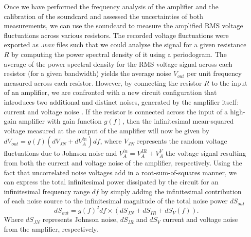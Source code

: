 \begin{linenumbers}
Once we have performed the frequency analysis of the amplifier and the calibration of the soundcard and assessed the uncertainties of both measurements, we can use the soundcard to measure the amplified RMS voltage fluctuations across various resistors. The recorded voltage fluctuations were exported as $.wav$ files such that we could analyse the signal for a given resistance $R$ by computing the power spectral density of it using a periodogram. The average of the power spectral density for the RMS voltage signal across each resistor (for a given bandwidth) yields the average noise $V_{out}$ per unit frequency measured across each resistor. 
However, by connecting the resistor $R$ to the input of an amplifier, we are confronted with a new circuit configuration that introduces two additional and distinct noises, generated by the amplifier itself: current and voltage noise \cite{article}. If the resistor is connected across the input of a high-gain amplifier with gain function $g(f)$, then the infinitesimal mean-squared voltage measured at the output of the amplifier will now be given by $dV_{out}=g(f)(dV_{JN}+dV_{A}^{in})df$, where $V_{JN}$ represents the random voltage fluctuations due to Johnson noise and $V_{A}^{in}=V_{A}^{IR}+V_{A}^{V}$ the voltage signal resulting from both the current and voltage noise of the amplifier, respectively. Using the fact that uncorrelated noise voltages add in a root-sum-of-squares manner, we can express the total infinitesimal power dissipated by the circuit for an infinitesimal frequency range $df$ by simply adding the infinitesimal contribution of each noise source to the infinitesimal magnitude of the total noise power $dS_{out}$
\begin{equation}
\label{eqn:infinitesimalS}
    dS_{out}=g(f)^2df\times(dS_{JN}+dS_{IR}+dS_{V} (f)). 
\end{equation}
Where $dS_{JN}$ represents Johnson noise, $dS_{IR}$ and $dS_{V}$ current and voltage noise from the amplifier, respectively. 

\end{linenumbers}
